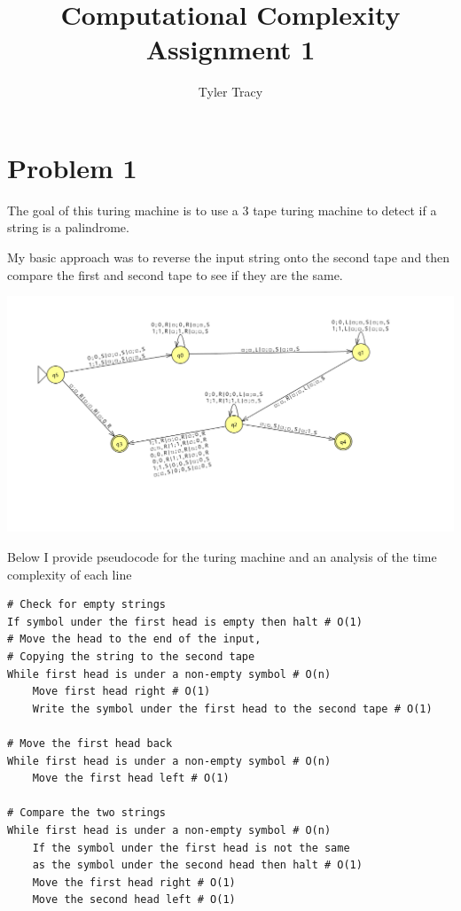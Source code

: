 \documentclass[12pt]{article}
\title{Computational Complexity Assignment 1}
\author{Tyler Tracy}
\begin{document}
\maketitle


\section{Problem 1}


The goal of this turing machine is to use a 3 tape turing machine to detect if a string is a palindrome.

My basic approach was to reverse the input string onto the second tape and then compare the first and second tape to see if they are the same.

\includegraphics[width=\textwidth]{problem1.png}

Below I provide pseudocode for the turing machine and an analysis of the time complexity of each line

\begin{lstlisting}[basicstyle=\small, tabsize=3]
# Check for empty strings
If symbol under the first head is empty then halt # O(1)
# Move the head to the end of the input,
# Copying the string to the second tape
While first head is under a non-empty symbol # O(n)
	Move first head right # O(1)
	Write the symbol under the first head to the second tape # O(1)

# Move the first head back
While first head is under a non-empty symbol # O(n)
	Move the first head left # O(1)

# Compare the two strings
While first head is under a non-empty symbol # O(n)
	If the symbol under the first head is not the same
	as the symbol under the second head then halt # O(1)
	Move the first head right # O(1)
	Move the second head left # O(1)
\end{lstlisting}
\end{document}
